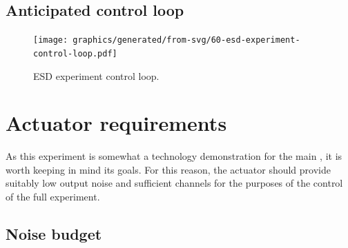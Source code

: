 \subsection{Anticipated control loop}

\begin{figure}
  \centering
  \texttt{[image: graphics/generated/from-svg/60-esd-experiment-control-loop.pdf]}
  \caption[Control loop for the electrostatic drive experiment]{\label{fig:esd-ansys}ESD experiment control loop.}
\end{figure}

\section{Actuator requirements}


As this experiment is somewhat a technology demonstration for the main \SSMEXPT{}, it is worth keeping in mind its goals. For this reason, the actuator should provide suitably low output noise and sufficient channels for the purposes of the control of the full experiment. 

\subsection{Noise budget}

